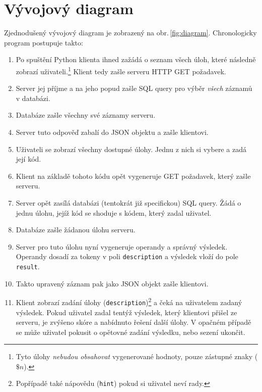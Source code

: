 \documentclass[titlepage]{article}
\begin{document}
\section{Vývojový diagram}
Zjednodušený vývojový diagram je zobrazený na obr.\,\ref{fig:diagram}. Chronologicky program postupuje takto:
\begin{enumerate}
    \item Po spuštění Python klienta ihned zažádá o seznam všech úloh, které následně zobrazí uživateli.\footnote{Tyto úlohy \emph{nebudou obsahovat} vygenerované hodnoty, pouze zástupné znaky ($\$n$).} Klient tedy zašle serveru HTTP GET po\-ža\-davek.
    \item Server jej příjme a na jeho popud zašle SQL query pro výběr \emph{všech} zá\-zna\-mů v databázi. 
    \item Databáze zašle všechny své záznamy serveru.
    \item Server tuto odpověď zabalí do JSON objektu a zašle klientovi. 
    \item Uživateli se zobrazí všechny dostupné úlohy. Jednu z nich si vybere a zadá její kód.
    \item Klient na základě tohoto kódu opět vygeneruje  GET požadavek, který zašle serveru. 
    \item Server opět zasílá databázi (tentokrát již specifickou) SQL query. Žádá o jednu úlohu, jejíž kód se shoduje s kódem, který zadal uživatel. 
    \item Databáze zašle žádanou úlohu serveru. 
    \item Server pro tuto úlohu nyní vygeneruje operandy a správný výsledek. Operandy dosadí za tokeny  v poli \texttt{description} a výsledek vloží do pole \texttt{result}. 
    \item Takto upravený záznam pak jako JSON objekt zašle klientovi.
    \item Klient zobrazí zadání úlohy (\texttt{description})\footnote{Popřípadě také nápovědu (\texttt{hint}) pokud si uživatel neví rady.} a čeká na uživatelem zadaný výsledek. Pokud uživatel zadal tentýž výsledek, který klientovi přišel ze serveru, je zvýšeno skóre a nabídnuto řešení další úlohy. V opačném případě se může uživatel pokusit o opětovné zadání výsledku, nebo sezení ukončit. 
\end{enumerate}
\end{document}
